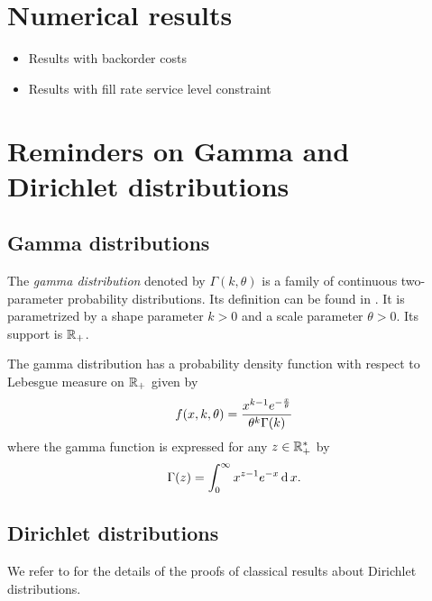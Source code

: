 \section{Numerical results}
\label{sec:PDP:numerical-experiments:numerical-results}


\begin{itemize}
  \item Results with backorder costs
  \item Results with fill rate service level constraint
\end{itemize}




\section{Reminders on Gamma and Dirichlet distributions}
\label{sec:reminders:gamma-and-dirichlet-distributions}



\subsection{Gamma distributions}

The \emph{gamma distribution} denoted by $\Gamma(k,\theta)$ is a family of continuous two-parameter probability distributions.
Its definition can be found in \cite[Appendix A]{Delmas2006}.
It is parametrized by a shape parameter $k>0$ and a scale parameter $\theta>0$.
Its support is $\mathbb{R}_+$.

The gamma distribution has a probability density function with respect to Lebesgue measure on $\mathbb{R}_+$ given by
\begin{equation}\label{eq:dirchlet:probability-density-function}
  f\bracket{x,k,\theta} = \frac{x^{k-1}e^{-\frac{x}{\theta}}}{ \theta^k\Gamma\bracket{k} }
\end{equation}
where the gamma function is expressed for any $z\in\mathbb{R}_+^*$ by
\begin{equation}
  \Gamma\bracket{z} = \int_0^{\infty} x^{z-1}e^{-x} \diff x.
\end{equation}


\subsection{Dirichlet distributions}

We refer to \cite[Chapter 49]{Kotz2000} for the details of the proofs of classical results about Dirichlet distributions.


